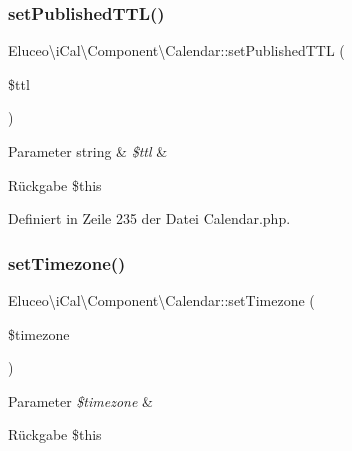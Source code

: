 \subsubsection{\texorpdfstring{set\+Published\+T\+T\+L()}{setPublishedTTL()}\hspace{0.1cm}{\footnotesize\ttfamily [3/3]}}
{\footnotesize\ttfamily Eluceo\textbackslash{}i\+Cal\textbackslash{}\+Component\textbackslash{}\+Calendar\+::set\+Published\+T\+TL (\begin{DoxyParamCaption}\item[{}]{\$ttl }\end{DoxyParamCaption})}


\begin{DoxyParams}[1]{Parameter}
string & {\em \$ttl} & \\
\hline
\end{DoxyParams}
\begin{DoxyReturn}{Rückgabe}
\$this 
\end{DoxyReturn}


Definiert in Zeile 235 der Datei Calendar.\+php.

\mbox{\label{class_eluceo_1_1i_cal_1_1_component_1_1_calendar_a4f3e601c0ef99350dc2b4d454fb126c9}} 
\subsubsection{\texorpdfstring{set\+Timezone()}{setTimezone()}\hspace{0.1cm}{\footnotesize\ttfamily [1/3]}}
{\footnotesize\ttfamily Eluceo\textbackslash{}i\+Cal\textbackslash{}\+Component\textbackslash{}\+Calendar\+::set\+Timezone (\begin{DoxyParamCaption}\item[{}]{\$timezone }\end{DoxyParamCaption})}


\begin{DoxyParams}{Parameter}
{\em \$timezone} & \\
\hline
\end{DoxyParams}
\begin{DoxyReturn}{Rückgabe}
\$this 
\end{DoxyReturn}



